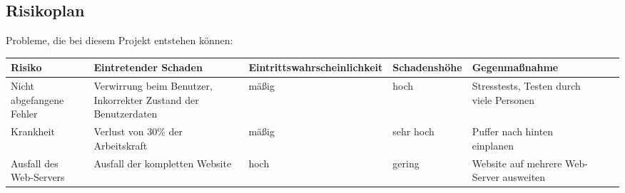 %
%	

\begin{landscape}
\begin{center}
\section{Risikoplan}
Probleme, die bei diesem Projekt entstehen können:

\begin{tabulary}{1.35\textwidth}{|L|L|L|L|L|L|L|}
\hline 
\textbf{Risiko} & \textbf{Eintretender Schaden} & \textbf{Eintrittswahrscheinlichkeit} & \textbf{Schadenshöhe} & \textbf{Gegenmaßnahme} \\ 
\hline 
Nicht abgefangene Fehler & Verwirrung beim Benutzer, Inkorrekter Zustand der Benutzerdaten & mäßig & hoch & Stresstests, Testen durch viele Personen\\ 
\hline
Krankheit & Verlust von 30\% der Arbeitskraft & mäßig & sehr hoch & Puffer nach hinten einplanen \\ 
\hline
Ausfall des Web-Servers & Ausfall der kompletten Website & hoch & gering & Website auf mehrere Web-Server ausweiten \\ 
\hline
\end{tabulary}

\bigskip

\end{center}
\end{landscape}
